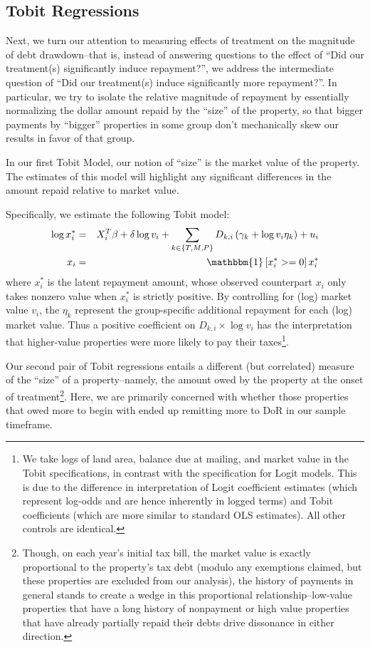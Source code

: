 \documentclass[12pt,titlepage]{article}
\begin{document}
\subsection{Tobit Regressions}

Next, we turn our attention to measuring effects of treatment on the
magnitude of debt drawdown--that is, instead of answering questions to
the effect of ``Did our treatment(s) significantly induce
repayment?'', we address the intermediate question of ``Did
our treatment(s) induce significantly more repayment?''.
In particular, we try to isolate the relative magnitude of repayment
by essentially normalizing the dollar amount repaid by the ``size'' of
the property, so that bigger payments by ``bigger'' properties in some
group don't mechanically skew our results in favor of that group.

In our first Tobit Model, our notion of ``size'' is the market value
of the property. The estimates of this model will highlight any
significant differences in the amount repaid relative to market value.

Specifically, we estimate the following Tobit model:
\begin{eqnarray}
\log x_{i}^{*} & = & X^T_i \beta +\delta \log v_{i}+
\sum_{k\in\{T,M,P\}}D_{k,i}\left(\gamma_{k}+\log v_{i}\eta_{k}\right)+u_{i}\\
x_{i} & = & \mathbbm{1}\left[x_{i}^{*}>=0\right]x_{i}^{*} \nonumber
\end{eqnarray}
where  $x_{i}^{*}$ is the latent repayment amount, whose observed
counterpart $x_i$ only takes nonzero value when $x_i^{*}$ is strictly
positive. By controlling for (log) market value $v_i$, the
$\eta_{k}$ represent the group-specific additional repayment for
each (log) market value. Thus a positive coefficient on
$D_{k,i}\times\log v_i$ has the interpretation that higher-value
properties were more likely to pay their taxes\footnote{We take
logs of land area, balance due at mailing, and market value in
the Tobit specifications, in contrast with the specification for
Logit models. This is due to the difference in interpretation of
Logit coefficient estimates (which represent log-odds and are
hence inherently in logged terms) and Tobit coefficients (which are more
similar to standard OLS estimates). All other controls are identical.}.

Our second pair of Tobit regressions entails a different (but
correlated) measure of the ``size'' of a property--namely, the amount
owed by the property at the onset of treatment\footnote{Though, on
  each year's initial tax bill, the market value is exactly
  proportional to the property's tax debt (modulo any exemptions
  claimed, but these properties are excluded from our analysis), the
  history of payments in general stands to create a wedge in this
  proportional relationship--low-value properties that have a long
  history of nonpayment or high value properties that have already
  partially repaid their debts drive dissonance in either direction.}.
Here, we are primarily concerned with whether those properties that
owed more to begin with ended up remitting more to DoR in our sample
timeframe.
\end{document}
